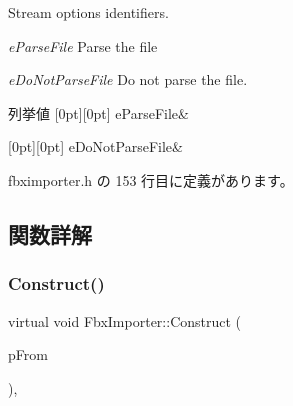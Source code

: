 Stream options identifiers.
\begin{DoxyItemize}
\item {\itshape e\+Parse\+File} Parse the file
\item {\itshape e\+Do\+Not\+Parse\+File} Do not parse the file. 
\end{DoxyItemize}\begin{DoxyEnumFields}{列挙値}
[0pt][0pt]{}\mbox{\label{class_fbx_importer_a5174c9311e7e1295e7bf3338d209def5a1f5881070de76430876af4547ce9fc0a}} 
e\+Parse\+File&\\
\hline

[0pt][0pt]{}\mbox{\label{class_fbx_importer_a5174c9311e7e1295e7bf3338d209def5a42759353b2b5126a87bae098ad2724ae}} 
e\+Do\+Not\+Parse\+File&\\
\hline

\end{DoxyEnumFields}


 fbximporter.\+h の 153 行目に定義があります。



\subsection{関数詳解}
\mbox{\label{class_fbx_importer_ada4dcdb8770ebe90bacd9adcb3f562c0}} 
\subsubsection{\texorpdfstring{Construct()}{Construct()}}
{\footnotesize\ttfamily virtual void Fbx\+Importer\+::\+Construct (\begin{DoxyParamCaption}\item[{const \hyperlink{class_fbx_object}{Fbx\+Object} $\ast$}]{p\+From }\end{DoxyParamCaption})\hspace{0.3cm}{\ttfamily [protected]}, {\ttfamily [virtual]}}

